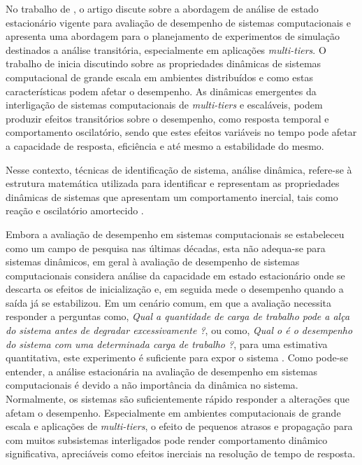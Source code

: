 No trabalho de , o artigo discute sobre a abordagem de análise de estado estacionário vigente para avaliação de desempenho de sistemas computacionais e apresenta uma abordagem para o planejamento de experimentos de simulação destinados a análise transitória, especialmente em aplicações \textit{multi-tiers}.
O trabalho de  inicia discutindo sobre as propriedades dinâmicas de sistemas computacional de grande escala em ambientes distribuídos e como estas características podem afetar o desempenho. As dinâmicas emergentes da interligação de sistemas computacionais de \textit{multi-tiers} e escaláveis, podem produzir efeitos transitórios sobre o desempenho, como resposta temporal e comportamento oscilatório, sendo que estes efeitos variáveis no tempo pode afetar a capacidade de resposta, eficiência e até mesmo a estabilidade do mesmo. 

\begin{citacao}
	Nesse contexto, técnicas de identificação de sistema, análise dinâmica, refere-se à estrutura matemática utilizada para identificar e representam as propriedades dinâmicas de sistemas que apresentam um comportamento inercial, tais como reação e oscilatório amortecido \cite{Lourenco2015}. 
\end{citacao}

Embora a avaliação de desempenho em sistemas computacionais se estabeleceu como um campo de pesquisa nas últimas décadas, esta não adequa-se para sistemas dinâmicos, em geral à avaliação de desempenho de sistemas computacionais considera análise da capacidade em estado estacionário onde se descarta os efeitos de inicialização e, em seguida mede o desempenho quando a saída já se estabilizou. Em um cenário comum, em que a avaliação necessita responder a perguntas como, \textit{Qual a quantidade de carga de trabalho pode a alça do sistema antes de degradar excessivamente ?}, ou como, \textit{Qual o é o desempenho do sistema com uma determinada carga de trabalho ?}, para uma estimativa quantitativa, este experimento é suficiente para expor o sistema \cite{Lourenco2015}.
Como pode-se entender, a análise estacionária na avaliação de desempenho em sistemas computacionais é devido a não importância da dinâmica no sistema. Normalmente, os sistemas são suficientemente rápido responder a alterações que afetam o desempenho. Especialmente em ambientes computacionais de grande escala e aplicações de \textit{multi-tiers}, o efeito de pequenos atrasos e propagação para com muitos subsistemas interligados pode render comportamento dinâmico significativa, apreciáveis como efeitos inerciais na resolução de tempo de resposta. 

